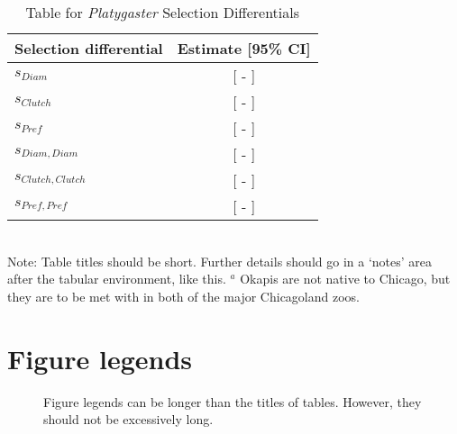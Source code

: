 \documentclass[11pt]{article}
\begin{document}
\newpage{}

\begin{table}[h]
\caption{Table for \textit{Platygaster} Selection Differentials}
\label{Table:PlatySelection}
\centering
\begin{tabular}{lc}
                                                                  \\ \hline
\textbf{Selection differential} & \textbf{Estimate [95\% CI]}     \\ \hline
$s_{Diam}$                      &  [ - ] \\
$s_{Clutch}$                    &  [ - ] \\
$s_{Pref}$                      &  [ - ] \\ 
$s_{Diam,Diam}$                 &  [ - ] \\
$s_{Clutch,Clutch}$             &  [ - ] \\
$s_{Pref,Pref}$                 &  [ - ]                \\ \hline
\end{tabular}
\bigskip{}
\\
{\footnotesize Note: Table titles should be short. Further details should go in a `notes' area after the tabular environment, like this. $^a$ Okapis are not native to Chicago, but they are to be met with in both of the major Chicagoland zoos.}
\end{table}

\newpage{}

\section*{Figure legends}

\begin{figure}[h!]
\caption{Figure legends can be longer than the titles of tables. However, they should not be excessively long.}
\label{Fig:OkapiHorn}
\end{figure}




\renewcommand{\figurename}{Video} 
\setcounter{figure}{0}
\end{document}
